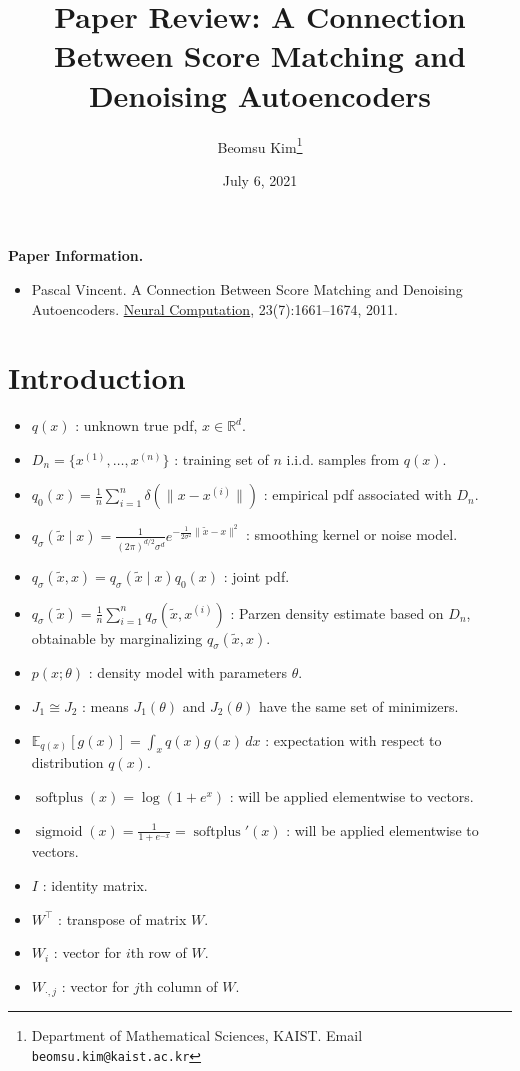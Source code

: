 \documentclass[10pt]{article}
\title{Paper Review: A Connection Between Score Matching and Denoising Autoencoders}
\author{Beomsu Kim\footnote{Department of Mathematical Sciences, KAIST. Email \texttt{beomsu.kim@kaist.ac.kr}}}
\date{July 6, 2021}
\newcommand{\RR}{\mathbb{R}}
\newcommand{\EE}{\mathbb{E}}
\DeclareMathOperator{\sigmoid}{sigmoid}
\DeclareMathOperator{\softplus}{softplus}
\begin{document}
\maketitle

\textbf{Paper Information.}

\begin{itemize}
\item Pascal Vincent. A Connection Between Score Matching and Denoising Autoencoders. \newline \underline{Neural Computation}, 23(7):1661--1674, 2011.
\end{itemize}

\section{Introduction}

\begin{itemize}
\item $q(x)$ : unknown true pdf, $x \in \RR^d$.
\item $D_n = \{x^{(1)}, \ldots, x^{(n)}\}$ : training set of $n$ i.i.d. samples from $q(x)$.
\item $q_0(x) = \frac{1}{n} \sum_{i = 1}^n \delta(\|x - x^{(i)}\|)$ : empirical pdf associated with $D_n$.
\item $q_\sigma(\tilde{x} \mid x) = \frac{1}{(2\pi)^{d/2} \sigma^d} e^{-\frac{1}{2\sigma^2} \|\tilde{x} - x\|^2}$ : smoothing kernel or noise model.
\item $q_\sigma(\tilde{x},x) = q_\sigma(\tilde{x} \mid x) q_0(x)$ : joint pdf.
\item $q_\sigma(\tilde{x}) = \frac{1}{n} \sum_{i = 1}^n q_\sigma(\tilde{x}, x^{(i)})$ : Parzen density estimate based on $D_n$, obtainable by marginalizing $q_\sigma(\tilde{x}, x)$.
\item $p(x;\theta)$ : density model with parameters $\theta$.
\item $J_1 \cong J_2$ : means $J_1(\theta)$ and $J_2(\theta)$ have the same set of minimizers.
\item $\EE_{q(x)} [g(x)] = \int_x q(x) g(x) \, dx$ : expectation with respect to distribution $q(x)$.
\item $\softplus(x) = \log(1 + e^x)$ : will be applied elementwise to vectors.
\item $\sigmoid(x) = \frac{1}{1 + e^{-x}} = \softplus'(x)$ : will be applied elementwise to vectors.
\item $I$ : identity matrix.
\item $W^\top$ : transpose of matrix $W$.
\item $W_i$ : vector for $i$th row of $W$.
\item $W_{\cdot,j}$ : vector for $j$th column of $W$.
\end{itemize}
\end{document}

